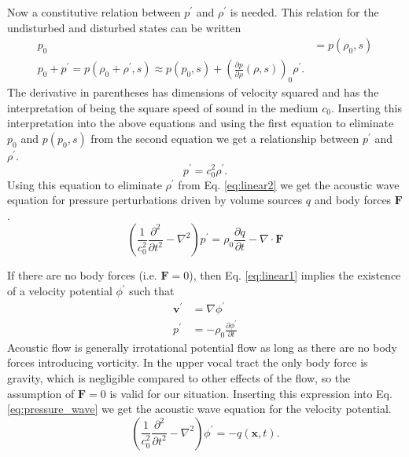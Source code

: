 \documentclass[12pt, letter]{report}
\begin{document}
Now a constitutive relation between $p^{'}$ and $\rho^{'}$ is needed. This relation for the undisturbed and disturbed states can be written
\begin{equation}
\begin{split}
p_0 &= p(\rho_0, s) \\
p_0 + p^{'} = p(\rho_0+\rho^{'},s) \approx p(p_0, s) + \left( \frac{\partial p}{\partial \rho}(\rho,s) \right)_0 \rho^{'}.
\end{split}
\end{equation}
The derivative in parentheses has dimensions of velocity squared and has the interpretation of being the square speed of sound in the medium $c_0$. Inserting this interpretation into the above equations and using the first equation to eliminate $p_0$ and $p(p_0, s)$ from the second equation we get a relationship between $ p^{'}$ and $\rho^{'}$.
\begin{equation} 
p^{'} = c_0^2 \rho^{'}.
\end{equation}
Using this equation to eliminate $\rho^{'}$ from Eq. \ref{eq:linear2} we get the acoustic wave equation for pressure perturbations driven by volume sources $q$ and body forces $\textbf{F}$.
\begin{equation} 
\label{eq:pressure_wave}
\left( \frac{1}{c_0^2}\frac{\partial^2 }{\partial t^2} - \nabla^2 \right)p^{'}=\rho_0 \frac{\partial q}{\partial t} - \nabla \cdot \textbf{F}
\end{equation}

If there are no body forces (i.e. $\textbf{F}=0$), then Eq. \ref{eq:linear1} implies the existence of a velocity potential $\phi^{'}$ such that
\begin{equation}
\begin{split}
\textbf{v}^{'} &=\nabla \phi^{'} \\
p^{'} &= -\rho_0 \frac{\partial \phi^{'}}{\partial t}
\end{split}
\end{equation}
Acoustic flow is generally irrotational potential flow as long as there are no body forces introducing vorticity. In the upper vocal tract the only body force is gravity, which is negligible compared to other effects of the flow, so the assumption of $\textbf{F}=0$ is valid for our situation. Inserting this expression into Eq. \ref{eq:pressure_wave} we get the acoustic wave equation for the velocity potential.
\begin{equation}
\label{eq:potential_wave}
\left( \frac{1}{c_0^2}\frac{\partial^2 }{\partial t^2} - \nabla^2 \right)\phi^{'}= -q(\textbf{x}, t).
\end{equation}
\end{document}
